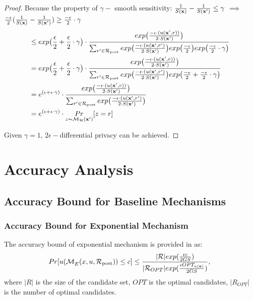 \documentclass{article}
\begin{document}
\begin{proof}
  Because the property of $\gamma -$ smooth sensitivity: $\frac{1}{S(\textbf{x})} - \frac{1}{S(\textbf{x}')} \leq \gamma$ $\implies$
  $\frac{- \epsilon}{2}
  (\frac{1}{S(\textbf{x})}-
  \frac{1}{S(\textbf{x}')}) \geq \frac{- \epsilon}{2} \cdot \gamma$
  \begin{equation*}
  \begin{split}
  & \leq exp\big( \frac{\epsilon}{2} + \frac{\epsilon}{2} \cdot \gamma\big) \cdot 
  \frac {
  exp
  \big(
  \frac{-\epsilon\cdot(u(\textbf{x}', {r}))}{2\cdot S(\textbf{x}')}
  \big)
  } 
  {
  \sum_{r'\in \mathcal{R}_{\textup{post}}} 
  exp 
  \big(
  \frac{-\epsilon\cdot(u(\textbf{x}', {r'})}{2 \cdot S(\textbf{x}')}
  \big)
  exp 
  \big(
  \frac{-\epsilon}{2}
  \big)
  exp
  \big(
  \frac{- \epsilon}{2} \cdot \gamma
  \big)
  }\\
  & = exp\big( \frac{\epsilon}{2} + \frac{\epsilon}{2} \cdot \gamma\big) \cdot 
  \frac {
  exp
  \big(
  \frac{-\epsilon\cdot(u(\textbf{x}', {r}))}{2\cdot S(\textbf{x}')}
  \big)
  } 
  {
  \sum_{r'\in \mathcal{R}_{\textup{post}}} 
  exp 
  \big(
  \frac{-\epsilon\cdot(u(\textbf{x}', {r'})}{2 \cdot S(\textbf{x}')}
  \big)
  exp 
  \big(
  \frac{-\epsilon}{2} +   \frac{- \epsilon}{2} \cdot \gamma
  \big)
  }\\
  & = e^{(\epsilon + \epsilon \cdot \gamma )} \cdot 
  \frac {
  exp
  \big(
  \frac{-\epsilon\cdot(u(\textbf{x}', {r}))}{2\cdot S(\textbf{x}')}
  \big)
  } 
  {
  \sum_{r'\in \mathcal{R}_{\textup{post}}} 
  exp 
  \big(
  \frac{-\epsilon\cdot(u(\textbf{x}', {r'})}{2 \cdot S(\textbf{x}')}
  \big)
  }\\
  & = e^{( \epsilon + \epsilon \cdot \gamma )} \cdot   \underset{z \thicksim \mathcal{M}_{\mathcal{H}}(\textbf{x}')}{Pr}[z = r]
  \end{split}
  \end{equation*}

  Given $\gamma = 1$, $2\epsilon - $differential privacy can be achieved.
\end{proof}





\section{Accuracy Analysis}

\subsection{Accuracy Bound for Baseline Mechanisms}

\subsubsection{Accuracy Bound for Exponential Mechanism}
\label{subsec_accuracy_global}
The accuracy bound of exponential mechanism is provided in \cite{dwork2014algorithmic} as:
\begin{equation*}
Pr[u(\mathcal{M}_E^{}({x},{u},{\mathcal{R}_{\textup{post}}})) \leq c] 
		 \leq \frac{|\mathcal{R}|exp(\frac{\epsilon c}{2 GS})}{|\mathcal{R}_{OPT}| exp(\frac{\epsilon OPT_{u(\textbf{x})}}{2 GS})},
\end{equation*}
where $|R|$ is the size of the candidate set, $OPT$ is the optimal candidates, $|R_{OPT}|$ is the number of optimal candidates.
\end{document}
